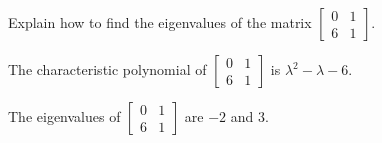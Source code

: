 
\begin{exerciseStatement}


Explain how to find the eigenvalues of the matrix \( \left[\begin{array}{cc}
0 & 1 \\
6 & 1
\end{array}\right] \).


\end{exerciseStatement}
    
\begin{exerciseAnswer} 


The characteristic polynomial of \( \left[\begin{array}{cc}
0 & 1 \\
6 & 1
\end{array}\right] \) is \( \lambda^{2} - \lambda - 6 \).



The eigenvalues of \( \left[\begin{array}{cc}
0 & 1 \\
6 & 1
\end{array}\right] \) are \( -2 \) and \( 3 \).


\end{exerciseAnswer}
    

